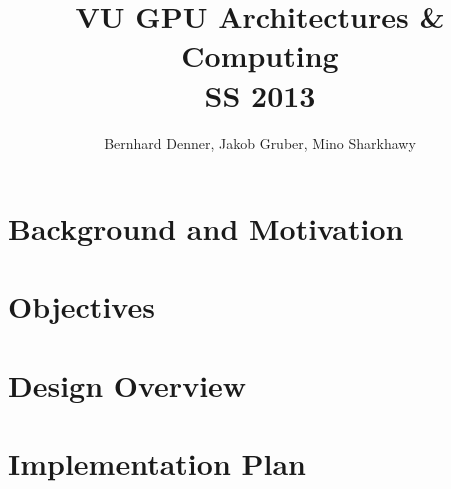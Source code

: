 \documentclass[a4paper,10pt]{article}
\title{
    VU GPU Architectures \& Computing \\
    SS 2013
}
\author{
    Bernhard Denner,
    Jakob Gruber,
    Mino Sharkhawy
}
\begin{document}
\maketitle

\section{Background and Motivation}

\section{Objectives}

\section{Design Overview}

\section{Implementation Plan}
\end{document}
